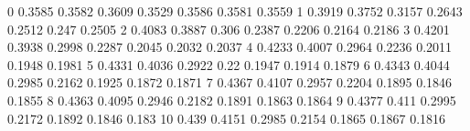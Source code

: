 0	0.3585	0.3582	0.3609	0.3529	0.3586	0.3581	0.3559
1	0.3919	0.3752	0.3157	0.2643	0.2512	0.247	0.2505
2	0.4083	0.3887	0.306	0.2387	0.2206	0.2164	0.2186
3	0.4201	0.3938	0.2998	0.2287	0.2045	0.2032	0.2037
4	0.4233	0.4007	0.2964	0.2236	0.2011	0.1948	0.1981
5	0.4331	0.4036	0.2922	0.22	0.1947	0.1914	0.1879
6	0.4343	0.4044	0.2985	0.2162	0.1925	0.1872	0.1871
7	0.4367	0.4107	0.2957	0.2204	0.1895	0.1846	0.1855
8	0.4363	0.4095	0.2946	0.2182	0.1891	0.1863	0.1864
9	0.4377	0.411	0.2995	0.2172	0.1892	0.1846	0.183
10	0.439	0.4151	0.2985	0.2154	0.1865	0.1867	0.1816
